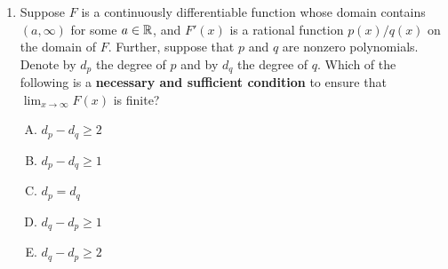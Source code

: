 \documentclass[10pt]{amsart}
\begin{document}
\begin{enumerate}
  \begin{enumerate}[(A)]
  \item $\{ -\pi, -e, 1/e,1/\pi \}$
  \item $\{ -\pi/2, -\sqrt{3}/2, 11/17,\pi^2/6 \}$
  \item $\{ -\pi^3/7,-\pi^2/6,\sqrt{13},11/2 \}$
  \item Knowing $F$ at any of the above determines the value of $F$
    uniquely.
  \item None of the above works to uniquely determine the value of
    $F$.
  \end{enumerate}

  {\em Answer}: Option (B)

  {\em Explanation}: The domain of $F$ has four connected components:
  the open intervals $(-\infty,-1)$, $(-1,0)$, $(0,1)$, and
  $(1,\infty)$. We need to know the value of $F$ at one point in each
  of these intervals. By computing values, we see that the set of
  points in option (B) has the property that it contains one point in
  each of these intervals, and those in options (A) and (C) do not.

  {\em Performance review}: $8$ out of $18$ people got this
  correct. $5$ chose (D), $3$ chose (A), $2$ left the question blank.

  {\em Historical note}: This question appeared in a 153 quiz. At the
  time, $14$ out of $27$ people got this correct. $6$ people chose (D),
  $4$ people chose (C), and $3$ people chose (A).

  Many people spent time trying to determine the coefficients of the
  partial fraction decomposition. This is not relevant to what we need
  to do in the question.

\item Suppose $F$ is a continuously differentiable function whose
  domain contains $(a,\infty)$ for some $a \in \mathbb{R}$, and $F'(x)$ is a
  rational function $p(x)/q(x)$ on the domain of $F$. Further, suppose
  that $p$ and $q$ are nonzero polynomials. Denote by $d_p$ the degree
  of $p$ and by $d_q$ the degree of $q$. Which of the following is a
  {\bf necessary and sufficient condition} to ensure that $\lim_{x \to
  \infty} F(x)$ is finite?

  \begin{enumerate}[(A)]
  \item $d_p - d_q \ge 2$
  \item $d_p - d_q \ge 1$
  \item $d_p = d_q$
  \item $d_q - d_p \ge 1$
  \item $d_q - d_p \ge 2$
  \end{enumerate}


\end{enumerate}
\end{document}
